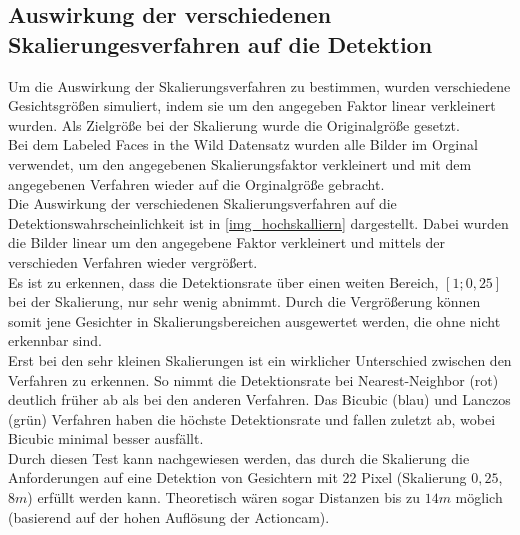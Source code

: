 \subsection{Auswirkung der verschiedenen Skalierungesverfahren auf die Detektion}
\label{OpenFace_skal}
Um die Auswirkung der Skalierungsverfahren zu bestimmen, wurden verschiedene Gesichtsgrößen simuliert, indem sie um den angegeben Faktor linear verkleinert wurden. Als Zielgröße bei der Skalierung wurde die Originalgröße gesetzt.\\
Bei dem Labeled Faces in the Wild \cite{database_Face} Datensatz wurden alle Bilder im Orginal verwendet, um den angegebenen Skalierungsfaktor verkleinert und mit dem angegebenen Verfahren wieder auf die Orginalgröße gebracht.\\
Die Auswirkung der verschiedenen Skalierungsverfahren auf die Detektionswahrscheinlichkeit ist in \autoref{img_hochskalliern} dargestellt. Dabei wurden die Bilder linear um den angegebene Faktor verkleinert und mittels der verschieden Verfahren wieder vergrößert.\\
Es ist zu erkennen, dass die Detektionsrate über einen weiten Bereich, $[1;0,25]$ bei der Skalierung, nur sehr wenig abnimmt. Durch die Vergrößerung können somit jene Gesichter in Skalierungsbereichen ausgewertet werden, die ohne nicht erkennbar sind.\\
Erst bei den sehr kleinen Skalierungen ist ein wirklicher Unterschied zwischen den Verfahren zu erkennen. So nimmt die Detektionsrate bei  Nearest-Neighbor (rot) deutlich früher ab als bei den anderen Verfahren. Das Bicubic (blau) und Lanczos (grün) Verfahren haben die höchste Detektionsrate und fallen zuletzt ab, wobei Bicubic minimal besser ausfällt.\\
Durch diesen Test kann nachgewiesen werden, das durch die Skalierung die Anforderungen auf eine Detektion von Gesichtern mit 22 Pixel (Skalierung $0,25$, $8m$) erfüllt werden kann. Theoretisch wären sogar Distanzen bis zu $14m$ möglich (basierend auf der hohen Auflösung der Actioncam).
